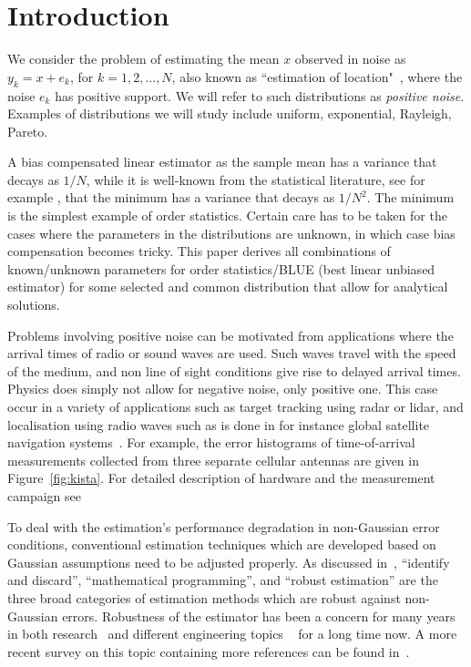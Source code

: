 \documentclass{article}
\begin{document}
\section{Introduction}\label{sec:introduction}
We consider the problem of estimating the mean $x$ observed in noise as $y_k=x+e_k$, for $k=1,2,\dots, N$,  also known as ``estimation of location"~\cite{article:PI_kassam_85}, where the noise $e_k$ has positive support. We will refer to such distributions as {\em positive noise}. Examples of distributions we will study include uniform, exponential, Rayleigh, Pareto.

A bias compensated linear estimator as the sample mean has a variance that decays as $1/N$, while it is well-known from the statistical literature, see for example \cite{book:ET_kay_93,book:TPE_lehmann}, that the minimum has a variance that decays as $1/N^2$. The minimum is the simplest example of order statistics. Certain care has to be taken for the cases where the parameters in the distributions are unknown, in which case bias compensation becomes tricky. This paper derives all combinations of known/unknown parameters for order statistics/BLUE (best linear unbiased estimator) for some selected and common distribution that allow for analytical solutions. 

Problems involving positive noise can be motivated from applications where the arrival times of radio or sound waves are used. Such waves travel with the speed of the medium, and non line of sight conditions give rise to delayed arrival times. Physics does simply not allow for negative noise, only positive one. This case occur in a variety of applications such as target tracking using radar or lidar, and localisation using radio waves such as is done in for instance global satellite navigation systems~\cite{article:ITVT_kok_15,article:ITVT_chen_09,article:ISPM_gustafsson_05,article:IME_eling_12}. For example, the error histograms of time-of-arrival measurements collected from three separate cellular antennas are given in Figure~\ref{fig:kista}. For detailed description of hardware and the measurement campaign see~\cite{conf:PIMRC_medbo_09}


To deal with the estimation's performance degradation in non-Gaussian error conditions, conventional estimation techniques which are developed based on Gaussian assumptions need to be adjusted properly. As discussed in~\cite{article:ITSP_yin_13}, ``identify and discard'', ``mathematical programming'', and ``robust estimation'' are the three broad categories of estimation methods which are robust against non-Gaussian errors. Robustness of the estimator has been a concern for many years in both research~\cite{article:JASA_stigler_73} and different engineering topics ~\cite{article:PI_kassam_85,book:SDNGN_kassam,article:SIAM_stewart_99,book:NSP_arce} for a long time now. A more recent survey on this topic containing more references can be found in~\cite{article:ISPM_zoubir_12}.
\end{document}
